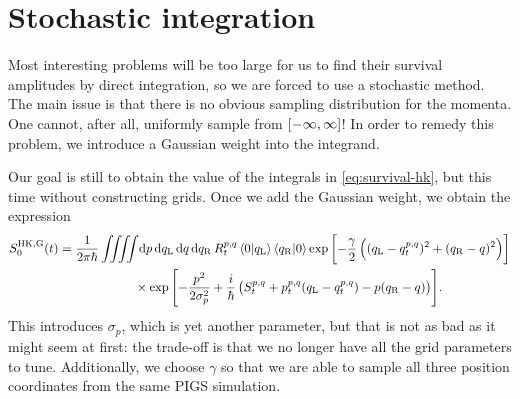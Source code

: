 \section{Stochastic integration}


Most interesting problems will be too large for us to find their survival amplitudes by direct integration, so we are forced to use a stochastic method.
The main issue is that there is no obvious sampling distribution for the momenta.
One cannot, after all, uniformly sample from $\intcc{-\infty, \infty}$!
In order to remedy this problem, we introduce a Gaussian weight into the integrand.

Our goal is still to obtain the value of the integrals in \vref{eq:survival-hk}, but this time without constructing grids.
Once we add the Gaussian weight, we obtain the expression
\begin{align}
	S_0\hkg(t)
	&= \frac{1}{2 \pi \hbar} \iiiint\! \dif p \dif q\LLup \dif q \dif q\RRup \,
			R\coh{p}{q}_t \braket{0 | q\LLup} \braket{q\RRup | 0}
			\expb{-\frac{\gamma}{2} \left( (q\LLup - q\coh{p}{q}_t)^2 + (q\RRup - q)^2 \right)} \notag \\
	&\qquad\qquad\qquad\times
			\expb{
				-\frac{p^2}{2 \sigma_p^2}
				+ \frac{i}{\hbar} \left( S\coh{p}{q}_t + p\coh{p}{q}_t (q\LLup - q\coh{p}{q}_t) - p (q\RRup - q) \right)
			}.
\end{align}
This introduces $\sigma_p$, which is yet another parameter, but that is not as bad as it might seem at first: the trade-off is that we no longer have all the grid parameters to tune.
Additionally, we choose $\gamma$ so that we are able to sample all three position coordinates from the same PIGS simulation.

